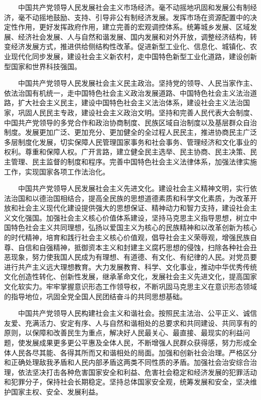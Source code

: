 　　中国共产党领导人民发展社会主义市场经济。毫不动摇地巩固和发展公有制经济，毫不动摇地鼓励、支持、引导非公有制经济发展。发挥市场在资源配置中的决定性作用，更好发挥政府作用，建立完善的宏观调控体系。统筹城乡发展、区域发展、经济社会发展、人与自然和谐发展、国内发展和对外开放，调整经济结构，转变经济发展方式，推进供给侧结构性改革。促进新型工业化、信息化、城镇化、农业现代化同步发展，建设社会主义新农村，走中国特色新型工业化道路，建设创新型国家和世界科技强国。

　　中国共产党领导人民发展社会主义民主政治。坚持党的领导、人民当家作主、依法治国有机统一，走中国特色社会主义政治发展道路、中国特色社会主义法治道路，扩大社会主义民主，建设中国特色社会主义法治体系，建设社会主义法治国家，巩固人民民主专政，建设社会主义政治文明。坚持和完善人民代表大会制度、中国共产党领导的多党合作和政治协商制度、民族区域自治制度以及基层群众自治制度。发展更加广泛、更加充分、更加健全的全过程人民民主，推进协商民主广泛多层制度化发展，切实保障人民管理国家事务和社会事务、管理经济和文化事业的权利。尊重和保障人权。广开言路，建立健全民主选举、民主协商、民主决策、民主管理、民主监督的制度和程序。完善中国特色社会主义法律体系，加强法律实施工作，实现国家各项工作法治化。

　　中国共产党领导人民发展社会主义先进文化。建设社会主义精神文明，实行依法治国和以德治国相结合，提高全民族的思想道德素质和科学文化素质，为改革开放和社会主义现代化建设提供强大的思想保证、精神动力和智力支持，建设社会主义文化强国。加强社会主义核心价值体系建设，坚持马克思主义指导思想，树立中国特色社会主义共同理想，弘扬以爱国主义为核心的民族精神和以改革创新为核心的时代精神，培育和践行社会主义核心价值观，倡导社会主义荣辱观，增强民族自尊、自信和自强精神，抵御资本主义和封建主义腐朽思想的侵蚀，扫除各种社会丑恶现象，努力使我国人民成为有理想、有道德、有文化、有纪律的人民。对党员要进行共产主义远大理想教育。大力发展教育、科学、文化事业，推动中华优秀传统文化创造性转化、创新性发展，继承革命文化，发展社会主义先进文化，提高国家文化软实力。牢牢掌握意识形态工作领导权，不断巩固马克思主义在意识形态领域的指导地位，巩固全党全国人民团结奋斗的共同思想基础。

　　中国共产党领导人民构建社会主义和谐社会。按照民主法治、公平正义、诚信友爱、充满活力、安定有序、人与自然和谐相处的总要求和共同建设、共同享有的原则，以保障和改善民生为重点，解决好人民最关心、最直接、最现实的利益问题，使发展成果更多更公平惠及全体人民，不断增强人民群众获得感，努力形成全体人民各尽其能、各得其所而又和谐相处的局面。加强和创新社会治理。严格区分和正确处理敌我矛盾和人民内部矛盾这两类不同性质的矛盾。加强社会治安综合治理，依法坚决打击各种危害国家安全和利益、危害社会稳定和经济发展的犯罪活动和犯罪分子，保持社会长期稳定。坚持总体国家安全观，统筹发展和安全，坚决维护国家主权、安全、发展利益。

